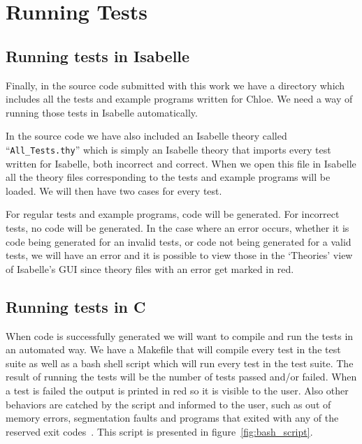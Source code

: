 \section{Running Tests}

\subsection{Running tests in Isabelle}

Finally, in the source code submitted with this work we have a directory which includes all the tests and example programs written for Chloe.
We need a way of running those tests in Isabelle automatically.

In the source code we have also included an Isabelle theory called ``\verb|All_Tests.thy|'' which is simply an Isabelle theory that imports every test written for Isabelle, both incorrect and correct.
When we open this file in Isabelle all the theory files corresponding to the tests and example programs will be loaded.
We will then have two cases for every test.

For regular tests and example programs, code will be generated.
For incorrect tests, no code will be generated.
In the case where an error occurs, whether it is code being generated for an invalid tests, or code not being generated for a valid tests, we will have an error and it is possible to view those in the `Theories' view of Isabelle's GUI since theory files with an error get marked in red.

\subsection{Running tests in C}

When code is successfully generated we will want to compile and run the tests in an automated way.
We have a Makefile that will compile every test in the test suite as well as a bash shell script which will run every test in the test suite.
The result of running the tests will be the number of tests passed and/or failed.
When a test is failed the output is printed in red so it is visible to the user.
Also other behaviors are catched by the script and informed to the user, such as out of memory errors, segmentation faults and programs that exited with any of the reserved exit codes~\parencite{bash-scripting}.
This script is presented in figure~\ref{fig:bash_script}.

